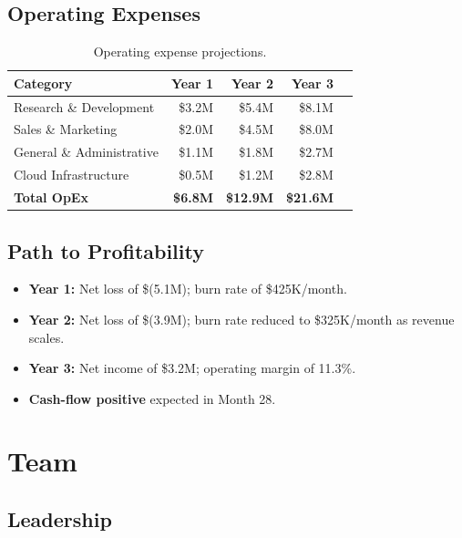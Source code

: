 \documentclass[
    language=english,
    doctype=business-plan,
    institution=none,
]{../../omnilatex}
\begin{document}
\subsection{Operating Expenses}

\begin{table}[h]
    \centering
    \begin{tabular}{lrrrr}
        \toprule
        \textbf{Category} & \textbf{Year 1} & \textbf{Year 2} & \textbf{Year 3} \\
        \midrule
        Research \& Development  & \$3.2M  & \$5.4M  & \$8.1M  \\
        Sales \& Marketing       & \$2.0M  & \$4.5M  & \$8.0M  \\
        General \& Administrative & \$1.1M & \$1.8M  & \$2.7M  \\
        Cloud Infrastructure     & \$0.5M  & \$1.2M  & \$2.8M  \\
        \midrule
        \textbf{Total OpEx}      & \textbf{\$6.8M} & \textbf{\$12.9M} & \textbf{\$21.6M} \\
        \bottomrule
    \end{tabular}
    \caption{Operating expense projections.}
\end{table}

\subsection{Path to Profitability}

\begin{itemize}
    \item \textbf{Year 1:} Net loss of \$(5.1M); burn rate of \$425K/month.
    \item \textbf{Year 2:} Net loss of \$(3.9M); burn rate reduced to
          \$325K/month as revenue scales.
    \item \textbf{Year 3:} Net income of \$3.2M; operating margin of 11.3\%.
    \item \textbf{Cash-flow positive} expected in Month 28.
\end{itemize}

\section{Team}

\subsection{Leadership}
\end{document}
